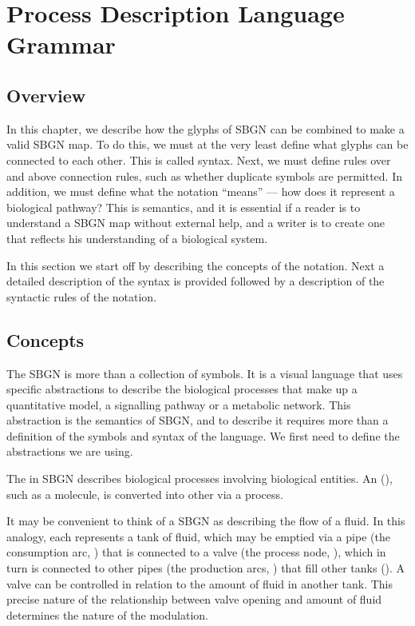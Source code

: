 \chapter{Process Description Language Grammar}
\label{chp:grammar}

\section{Overview}

In this chapter, we describe how the glyphs of SBGN can be combined
to make a valid SBGN map. To do this, we must at the very least
define what glyphs can be connected to each other. This is called
syntax. Next, we must define rules over and above connection rules,
such as whether duplicate symbols are permitted. In addition, we must define what the notation ``means'' --- how does it represent a biological pathway? This is semantics, and it is essential if a reader is to understand a SBGN map without external help, and a writer is to create one that reflects his understanding of a biological system.

In this section we start off by describing the concepts of the
\PD{} notation. Next a detailed description of the syntax is provided
followed by a description of the syntactic rules of the notation.

\section{Concepts}

The SBGN \PD{} is more than a collection of symbols. It is a
visual language that uses specific abstractions to describe the
biological processes that make up a quantitative model, a signalling pathway or a metabolic network. This abstraction is the
semantics of SBGN, and to describe it requires more than a definition
of the symbols and syntax of the language. We first need to define the
abstractions we are using.

The \PD{} in SBGN describes biological processes involving biological entities. An  (), such as a molecule, is converted into other  via a process. 

It may be convenient to think of a SBGN \PD{} as describing the
flow of a fluid. In this analogy, each  represents a
tank of fluid, which may be emptied via a pipe (the consumption arc, ) 
that is connected to a valve (the process node, ), which in turn is
connected to other pipes (the production arcs, ) that fill other tanks
(). A valve can be
controlled in relation to the amount of fluid in another tank.  This
precise nature of the relationship between valve opening and amount of
fluid determines the nature of the modulation.

